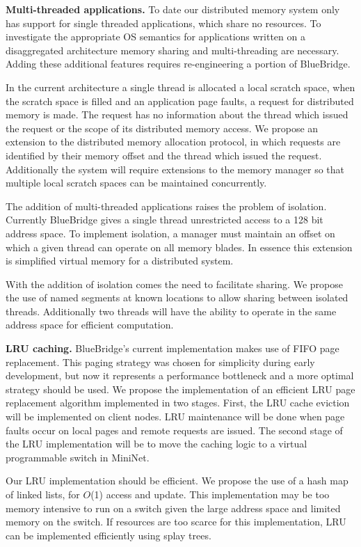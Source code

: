 \textbf{Multi-threaded applications.} To date our
distributed memory system only has support for single threaded
applications, which share no resources. To investigate the appropriate
OS semantics for applications written on a disaggregated architecture
memory sharing and multi-threading are necessary. Adding these
additional features requires re-engineering a portion of BlueBridge.

In the current architecture a single thread is allocated a local
scratch space, when the scratch space is filled and an application
page faults, a request for distributed memory is made. The request has
no information about the thread which issued the request or the scope
of its distributed memory access. We propose an extension to the
distributed memory allocation protocol, in which requests are
identified by their memory offset and the thread which issued the
request. Additionally the system will require extensions to the memory
manager so that multiple local scratch spaces can be maintained
concurrently.

The addition of multi-threaded applications raises the problem of
isolation. Currently BlueBridge gives a single thread unrestricted
access to a 128 bit address space. To implement isolation, a manager
must maintain an offset on which a given thread can operate on all
memory blades. In essence this extension is simplified virtual memory
for a distributed system.

With the addition of isolation comes the need to facilitate sharing.
We propose the use of named segments at known locations to allow
sharing between isolated threads. Additionally two threads will have
the ability to operate in the same address space for efficient
computation.

\textbf{LRU caching.} BlueBridge's current implementation
makes use of FIFO page replacement. This paging strategy was chosen
for simplicity during early development, but now it represents a
performance bottleneck and a more optimal strategy should be used. We
propose the implementation of an efficient LRU page replacement
algorithm implemented in two stages. First, the LRU cache eviction
will be implemented on client nodes. LRU maintenance will be done when
page faults occur on local pages and remote requests are issued. The
second stage of the LRU implementation will be to move the caching
logic to a virtual programmable switch in MiniNet.

Our LRU implementation should be efficient. We propose the use of a
hash map of linked lists, for $O$(1) access and update. This implementation may
be too memory intensive to run on a switch given the large address
space and limited memory on the switch. If resources are too scarce
for this implementation, LRU can be implemented efficiently using
splay trees.

